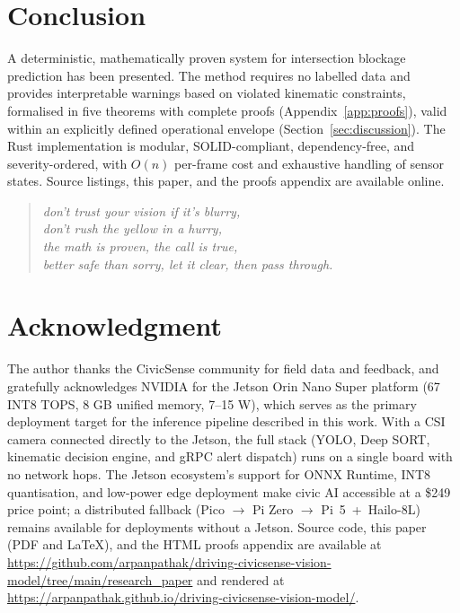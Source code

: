 \documentclass[conference, a4paper]{IEEEtran}
\theoremstyle{plain}
\begin{document}
\section{Conclusion}
\label{sec:conclusion}
A deterministic, mathematically proven system for intersection blockage
prediction has been presented. The method requires no labelled data and
provides interpretable warnings based on violated kinematic constraints,
formalised in five theorems with complete proofs
(Appendix~\ref{app:proofs}), valid within an explicitly defined operational
envelope (Section~\ref{sec:discussion}). The Rust implementation is modular,
SOLID-compliant, dependency-free, and severity-ordered, with $O(n)$ per-frame
cost and exhaustive handling of sensor states. Source listings, this paper,
and the proofs appendix are available online.

\begin{quote}\small\itshape
don't trust your vision if it's blurry,\\
don't rush the yellow in a hurry,\\
the math is proven, the call is true,\\
better safe than sorry, let it clear, then pass through.
\end{quote}

\section*{Acknowledgment}
The author thanks the CivicSense community for field data and feedback,
and gratefully acknowledges NVIDIA for the Jetson Orin Nano Super
platform (67 INT8 TOPS, 8 GB unified memory, 7--15 W), which serves as
the primary deployment target for the inference pipeline described in
this work. With a CSI camera connected directly to the Jetson, the
full stack (YOLO, Deep SORT, kinematic decision engine, and gRPC alert
dispatch) runs on a single board with no network hops. The Jetson
ecosystem's support for ONNX Runtime, INT8 quantisation, and low-power
edge deployment make civic AI accessible at a \$249 price point;
a distributed fallback (Pico $\rightarrow$ Pi Zero $\rightarrow$
Pi~5~+~Hailo-8L) remains available for deployments without a Jetson.
Source code, this paper (PDF and \LaTeX{}), and the HTML proofs appendix are
available at
\url{https://github.com/arpanpathak/driving-civicsense-vision-model/tree/main/research_paper}
and rendered at
\url{https://arpanpathak.github.io/driving-civicsense-vision-model/}.

\appendices
\end{document}
